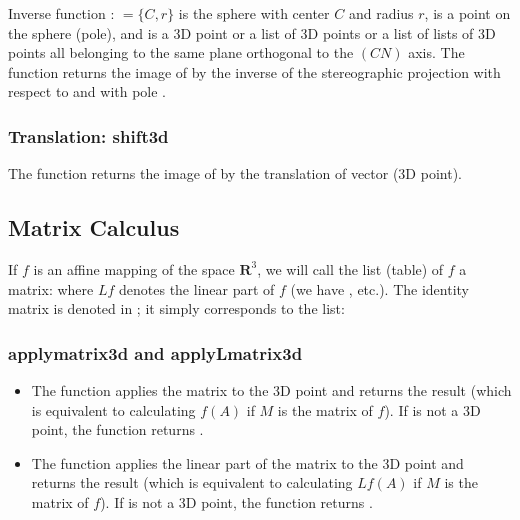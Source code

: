 Inverse function : $=\{C,r\}$ is the sphere with center $C$ and radius $r$,  is a point on the sphere  (pole), and  is a 3D point or a list of 3D points or a list of lists of 3D points all belonging to the same plane orthogonal to the $(CN)$ axis. The function returns the image of  by the inverse of the stereographic projection with respect to  and with pole .

\subsubsection{Translation: shift3d}

The function  returns the image of  by the translation of vector  (3D point).


\subsection{Matrix Calculus}

If $f$ is an affine mapping of the space $\mathbf R^3$, we will call the list (table) of $f$ a matrix:
where $Lf$ denotes the linear part of $f$ (we have , etc.). The identity matrix is ​​denoted  in \luadrawenv; it simply corresponds to the list: 

\subsubsection{applymatrix3d ​​and applyLmatrix3d}

\begin{itemize}
\item The function  applies the matrix  to the 3D point  and returns the result (which is equivalent to calculating $f(A)$ if $M$ is the matrix of $f$). If  is not a 3D point, the function returns .

\item The function  applies the linear part of the matrix  to the 3D point  and returns the result (which is equivalent to calculating $Lf(A)$ if $M$ is the matrix of $f$). If  is not a 3D point, the function returns .
\end{itemize}

